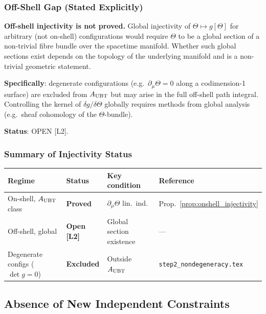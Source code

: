 \documentclass[12pt]{article}
\theoremstyle{definition}
\theoremstyle{remark}
\begin{document}
\subsubsection{Off-Shell Gap (Stated Explicitly)}

\begin{tcolorbox}[colback=orange!10!white,colframe=orange!75!black,
                  title={Gap: Off-shell global injectivity OPEN [L2]}]
\textbf{Off-shell injectivity is not proved.}
Global injectivity of $\Theta \mapsto g[\Theta]$ for arbitrary (not on-shell)
configurations would require $\Theta$ to be a global section of a non-trivial fibre
bundle over the spacetime manifold.  Whether such global sections exist depends on
the topology of the underlying manifold and is a non-trivial geometric statement.

\medskip
\textbf{Specifically}: degenerate configurations (e.g.\ $\partial_\mu\Theta = 0$
along a codimension-1 surface) are excluded from $A_{\rm UBT}$ but may arise in
the full off-shell path integral.  Controlling the kernel of $\delta g/\delta\Theta$
globally requires methods from global analysis (e.g.\ sheaf cohomology of the
$\Theta$-bundle).

\medskip
\textbf{Status}: OPEN [L2].
\end{tcolorbox}

\subsubsection{Summary of Injectivity Status}

\begin{center}
\renewcommand{\arraystretch}{1.3}
\begin{tabular}{llll}
\hline
\textbf{Regime} & \textbf{Status} & \textbf{Key condition} & \textbf{Reference} \\
\hline
On-shell, $A_{\rm UBT}$ class & \textbf{Proved} & $\partial_\mu\Theta$ lin.\ ind. & Prop.~\ref{prop:onshell_injectivity} \\
Off-shell, global & \textbf{Open [L2]} & Global section existence & — \\
Degenerate configs ($\det g = 0$) & \textbf{Excluded} & Outside $A_{\rm UBT}$ & \texttt{step2\_nondegeneracy.tex} \\
\hline
\end{tabular}
\end{center}

\subsection{Absence of New Independent Constraints}
\end{document}
